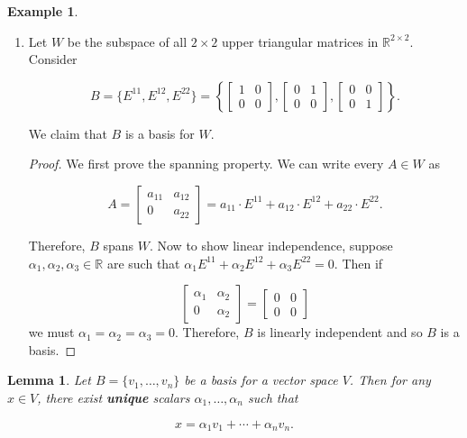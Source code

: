 \documentclass[12pt]{article}
\newtheorem*{lemma}{Lemma}
\theoremstyle{definition}
\newtheorem*{example}{Example}
\begin{document}
\begin{example}
\begin{enumerate}[label = (\arabic*)]
\item Let $W$ be the subspace of all $2 \times 2$ upper triangular matrices in $\mathbb{R}^{2 \times 2}$.
Consider

\[ B =  \{ E^{11}, E^{12}, E^{22} \} = \left\{ \begin{bmatrix} 1 & 0 \\ 0 & 0 \end{bmatrix},
\begin{bmatrix} 0 & 1 \\ 0 & 0 \end{bmatrix}, \begin{bmatrix} 0 & 0 \\ 0 & 1 \end{bmatrix} \right\}. \]

We claim that $B$ is a basis for $W$.

\begin{proof}
We first prove the spanning property. We can write every $A \in W$ as

\[ A =
\begin{bmatrix}
a_{11} & a_{12} \\
0 & a_{22}
\end{bmatrix}
=
a_{11} \cdot E^{11} + a_{12} \cdot E^{12} + a_{22} \cdot E^{22}.
\]


Therefore, $B$ spans $W$. Now to show linear independence, suppose 
$\alpha_1, \alpha_2, \alpha_3 \in \mathbb{R}$ are such that
$\alpha_1 E^{11} + \alpha_2 E^{12} + \alpha_3 E^{22} = 0$. Then if

\[
\begin{bmatrix}
\alpha_1 & \alpha_2 \\
0 & \alpha_2
\end{bmatrix}
= 
\begin{bmatrix}
0 & 0 \\
0 & 0
\end{bmatrix}
\]
we must $\alpha_1 = \alpha_2 = \alpha_3 = 0$. Therefore, $B$ is linearly independent and
so $B$ is a basis.

\end{proof}
\end{enumerate}
\end{example}

\begin{lemma}
Let $B = \{v_1, \ldots, v_n\}$ be a basis for a vector space $V$. Then for any $x \in V$,
there exist \textbf{unique} scalars $\alpha_1, \ldots, \alpha_n$ such that

\[x = \alpha_1 v_1 + \cdots + \alpha_n v_n. \]
\end{lemma}
\end{document}
